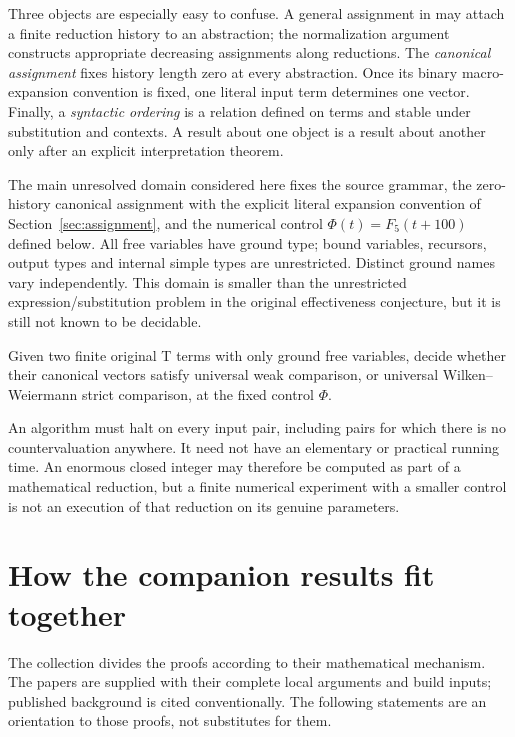 \documentclass[11pt,a4paper]{article}
\begin{document}
Three objects are especially easy to confuse.  A general assignment in
\cite{ww} may attach a finite reduction history to an abstraction; the
normalization argument constructs appropriate decreasing assignments along
reductions.  The \emph{canonical assignment} fixes history length zero at
every abstraction. Once its binary macro-expansion convention is fixed,
one literal input term determines one vector. Finally,
a \emph{syntactic ordering} is a relation defined on terms and stable under
substitution and contexts.  A result about one object is a result about
another only after an explicit interpretation theorem.

The main unresolved domain considered here fixes the source grammar,
the zero-history canonical assignment with the explicit literal expansion
convention of Section~\ref{sec:assignment}, and the numerical control
$\Phi(t)=F_5(t+100)$ defined below.  All free variables have ground type;
bound variables, recursors, output types and internal simple types are
unrestricted.  Distinct ground names vary independently.  This domain is
smaller than the unrestricted expression/substitution problem in the
original effectiveness conjecture, but it is still not known to be decidable.

\begin{problem}\label{prob:main}
Given two finite original T terms with only ground free variables, decide
whether their canonical vectors satisfy universal weak comparison, or
universal Wilken--Weiermann strict comparison, at the fixed control $\Phi$.
\end{problem}

An algorithm must halt on every input pair, including pairs for which there
is no countervaluation anywhere.  It need not have an elementary or practical
running time.  An enormous closed integer may therefore be computed as part
of a mathematical reduction, but a finite numerical experiment with a smaller
control is not an execution of that reduction on its genuine parameters.



\section{How the companion results fit together}\label{sec:companions}

The collection divides the proofs according to their mathematical mechanism.
The papers are supplied with their complete local arguments and build inputs;
published background is cited conventionally.  The following statements are
an orientation to those proofs, not substitutes for them.
\end{document}
